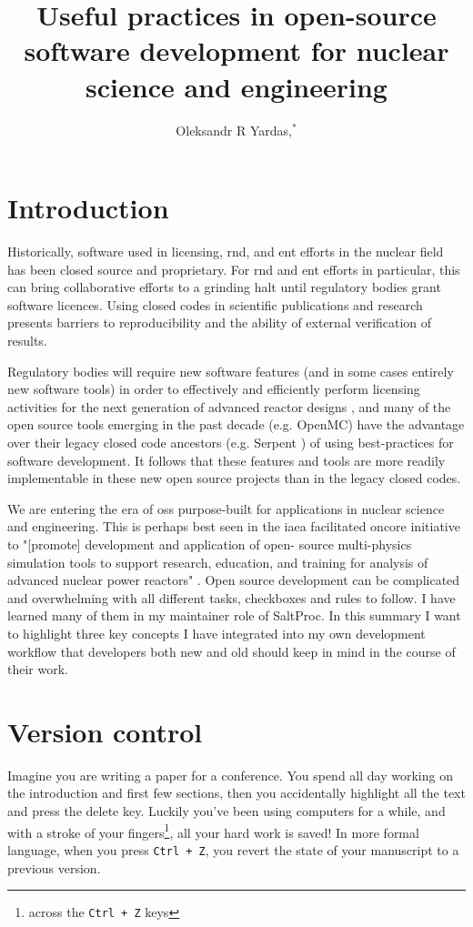 \documentclass{anstrans}
\title{Useful practices in open-source software development for nuclear science and engineering}
\author{Oleksandr R Yardas,$^{*}$}
\institute{
$^{*}$Advanced Reactors and Fuel Cycles, University of Illinois - Urbana Champaign.
Champaign, IL, oyardas2@illinois.edu
}
\begin{document}
\section{Introduction}
    Historically, software used in licensing, \Gls{rnd}, and \Gls{ent} efforts in the nuclear field has been closed source and proprietary. For \Gls{rnd} and \Gls{ent} efforts in particular, this can bring collaborative efforts to a grinding halt until regulatory bodies grant software licences. Using closed codes in scientific publications and research presents barriers to reproducibility and the ability of external verification of results.
    
    Regulatory bodies will require new software features (and in some cases entirely new software tools) in order to effectively and efficiently perform licensing activities for the next generation of advanced reactor designs \cite{usnrc_nonlwr_2020-1}, and many of the open source tools emerging in the past decade (e.g. OpenMC\cite{romano_openmc_2015}) have the advantage over their legacy closed code ancestors (e.g. Serpent \cite{leppanen_serpent_2014}) of using best-practices for software development. It follows that these features and tools are more readily implementable in these new open source projects than in the legacy closed codes.
    
    We are entering the era of \Gls{oss} purpose-built for applications in nuclear science and engineering. This is perhaps best seen in the \Gls{iaea} facilitated \Gls{oncore} initiative \cite{fiorina_initiative_2021} to "[promote] development and application of open- source multi-physics simulation tools to support research, education, and training for analysis of advanced nuclear power reactors"  \cite{iaea_open-source_2022}. Open source development can be complicated and overwhelming with all
    different tasks, checkboxes and rules to follow. I have learned many of them in my maintainer role of SaltProc\cite{rykhlevskii_arfcsaltproc_2018}. In this summary I want to highlight three key concepts I have integrated into my own development workflow that developers both new and old should keep in mind in the course of their work. 

\section{Version control}
    Imagine you are writing a paper for a conference. You spend all day working on the introduction and first few sections, then you accidentally highlight all the text and press the delete key. Luckily you've been using computers for a while, and with a stroke of your fingers\footnote{across the \verb.Ctrl + Z. keys}, all your hard work is saved! In more formal language, when you press \verb.Ctrl + Z., you revert the state of your manuscript to a previous version.
    
\end{document}
